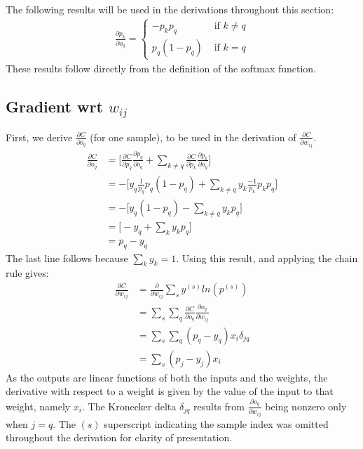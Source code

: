 \documentclass{article}
\begin{document}
   The following results will be used in the derivations throughout this section:
      \begin{equation*} \begin{split}
        \frac{ \partial p_k}{ \partial o_q } =
            \begin{cases}
               -p_k p_q       & \textrm{ if } k \neq q \\
               p_q (1 - p_q)  & \textrm{ if } k = q
            \end{cases}
      \end{split} \end{equation*}
   These results follow directly from the definition of the softmax function.


   \subsection{Gradient wrt $w_{ij}$}
   First, we derive $\frac{ \partial C}{ \partial o_q }$ (for one sample), to be used in the derivation of
   $\frac{ \partial C}{ \partial w_{ij} }$.
      \begin{equation*} \begin{split}
        \frac{ \partial C}{ \partial o_q }
           &= \bigg[   \frac{ \partial C}{ \partial p_q } \frac{ \partial p_q}{ \partial o_q }    +   \sum_{k \neq q} \frac{ \partial C}{ \partial p_k } \frac{ \partial p_k}{ \partial o_q }  \bigg]  \\
           &= - \bigg[    y_q \frac{1}{p_q} p_q (1 - p_q)  +   \sum_{k \neq q} y_k \frac{-1}{p_k} p_k p_q  \bigg]  \\
           &= - \bigg[    y_q (1 - p_q)  -  \sum_{k \neq q} y_k p_q       \bigg]   \\
           &=   \bigg[    - y_q  +  \sum_k y_k p_q   \bigg]  \\
           &=  p_q - y_q
      \end{split} \end{equation*}
   The last line follows because $\sum_k y_k = 1$. Using this result, and applying the chain rule
   gives:
      \begin{equation*} \begin{split}
        \frac{ \partial C}{ \partial w_{ij} }
           &= \frac{ \partial }{ \partial w_{ij} } \sum_{s} y^{(s)} ln(p^{(s)}) \\
           &= \sum_s \sum_q  \frac{ \partial C}{ \partial o_q } \frac{ \partial o_q }{ \partial w_{ij} } \\
           &= \sum_s \sum_q ( p_q - y_q ) x_i \delta_{jq}  \\
           &= \sum_s ( p_j - y_j ) x_i
      \end{split} \end{equation*}
   As the outputs are linear functions of both the inputs and the weights, the derivative
   with respect to a weight is given by the value of the input to that weight, namely $x_i$.
   The Kronecker delta $\delta_{jq}$ results from $ \frac{ \partial o_q }{ \partial w_{ij} } $
   being nonzero only when $j = q$.
   The $(s)$ superscript indicating the sample index was omitted throughout the derivation for clarity of presentation.
\end{document}
